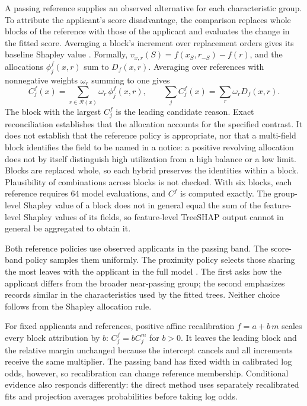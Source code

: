 A passing reference supplies an observed alternative for each characteristic group. To attribute the applicant's score disadvantage, the comparison replaces whole blocks of the reference with those of the applicant and evaluates the change in the fitted score. Averaging a block's increment over replacement orders gives its baseline Shapley value \citep{baseline,nair}. Formally, $v_{x,r}(S)=f(x_S,r_{-S})-f(r)$, and the allocations $\phi_j^f(x,r)$ sum to $D_f(x,r)$. Averaging over references with nonnegative weights $\omega_r$ summing to one gives
\begin{equation}\label{eq:attr}
C^f_j(x)=\sum_{r\in\mathcal R(x)}\omega_r\,\phi^f_j(x,r),\qquad \sum_jC^f_j(x)=\sum_r\omega_rD_f(x,r).
\end{equation}
The block with the largest $C^f_j$ is the leading candidate reason. Exact reconciliation establishes that the allocation accounts for the specified contrast. It does not establish that the reference policy is appropriate, nor that a multi-field block identifies the field to be named in a notice: a positive revolving allocation does not by itself distinguish high utilization from a high balance or a low limit. Blocks are replaced whole, so each hybrid preserves the identities within a block. Plausibility of combinations across blocks is not checked. With six blocks, each reference requires 64 model evaluations, and $C^f$ is computed exactly. The group-level Shapley value of a block does not in general equal the sum of the feature-level Shapley values of its fields, so feature-level TreeSHAP output cannot in general be aggregated to obtain it.

Both reference policies use observed applicants in the passing band. The score-band policy samples them uniformly. The proximity policy selects those sharing the most leaves with the applicant in the full model \citep{aarcgbdt}. The first asks how the applicant differs from the broader near-passing group; the second emphasizes records similar in the characteristics used by the fitted trees. Neither choice follows from the Shapley allocation rule.

For fixed applicants and references, positive affine recalibration $f=a+b\,m$ scales every block attribution by $b$: $C_j^f=bC_j^m$ for $b>0$. It leaves the leading block and the relative margin unchanged because the intercept cancels and all increments receive the same multiplier. The passing band has fixed width in calibrated log odds, however, so recalibration can change reference membership. Conditional evidence also responds differently: the direct method uses separately recalibrated fits and projection averages probabilities before taking log odds.

